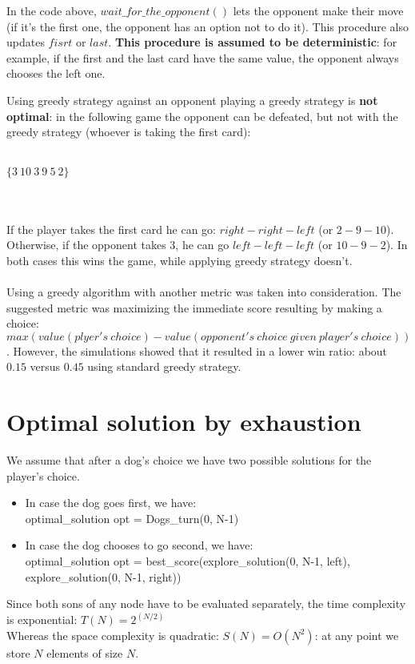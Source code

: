 \documentclass{article}
\begin{document}
In the code above, $wait\_for\_the\_opponent()$ lets the opponent make their move (if it's the first one, the opponent has an option not to do it). This procedure also updates $fisrt$ or $last$. \textbf{This procedure is assumed to be deterministic}: for example, if the first and the last card have the same value, the opponent always chooses the left one.

Using greedy strategy against an opponent playing a greedy strategy is \textbf{not optimal}: in the following game the opponent can be defeated, but not with the greedy strategy (whoever is taking the first card):\\
\\
\centerline{$\{3\ 10\ 3\ 9\ 5\ 2\}$}\\
\\
If the player takes the first card he can go: $right-right-left$ (or $2-9-10$). Otherwise, if the opponent takes $3$, he can go $left-left-left$ (or $10-9-2$). In both cases this wins the game, while applying greedy strategy doesn't.\\
\\
Using a greedy algorithm with another metric was taken into consideration. The suggested metric was maximizing the immediate score resulting by making a choice: $max(value(plyer's\ choice) - value(opponent's\ choice\ given\ player's\ choice))$. However, the simulations showed that it resulted in a lower win ratio: about $0.15$ versus $0.45$ using standard greedy strategy.

\section{Optimal solution by exhaustion}
We assume that after a dog’s choice we have two possible solutions for the player’s choice. 
\begin{itemize}
\item In case the dog goes first, we have:\\
optimal\_solution opt = Dogs\_turn(0, N-1)
\item In case the dog chooses to go second, we have:\\
optimal\_solution opt = best\_score(explore\_solution(0, N-1, left),\\ explore\_solution(0, N-1, right))
\end{itemize}
Since both sons of any node have to be evaluated separately, the time complexity is exponential: $T(N) = 2^{(N/2)}$\\
Whereas the space complexity is quadratic: $S(N) = O(N^2)$: at any point we store $N$ elements of size $N$.
\end{document}
